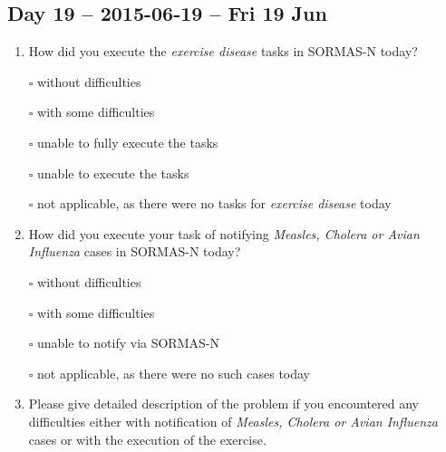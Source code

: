 \documentclass[a4paper, titlepage]{tufte-handout}
\begin{document}
\subsection{Day 19 -- 2015-06-19 -- Fri 19 Jun}
\label{sec-8-15}
\begin{enumerate}
\item How did you execute the \emph{exercise disease} tasks in SORMAS-N today?

\quad $\square$ without difficulties

\quad $\square$ with some difficulties

\quad $\square$ unable to fully execute the tasks

\quad $\square$ unable to execute the tasks

\quad $\square$ not applicable, as there were no tasks for \emph{exercise disease} today

\item How did you execute your task of notifying \emph{Measles, Cholera or Avian Influenza} cases in SORMAS-N today?

\quad $\square$ without difficulties

\quad $\square$ with some difficulties

\quad $\square$ unable to notify via SORMAS-N

\quad $\square$ not applicable, as there were no such cases today

\item Please give detailed description of the problem if you encountered any difficulties either with notification of \emph{Measles, Cholera or Avian Influenza} cases or with the execution of the exercise.

\hrulefill

\hrulefill

\hrulefill

\hrulefill

\hrulefill

\hrulefill

\hrulefill

\hrulefill

\hrulefill

\hrulefill
\end{enumerate}

\newpage
\end{document}
